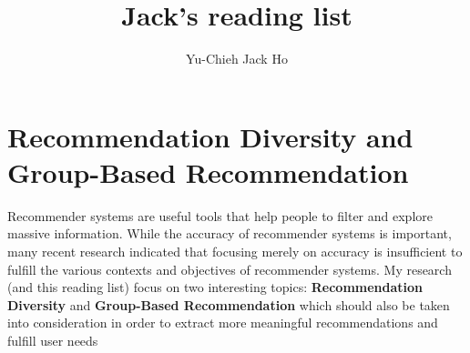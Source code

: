\documentclass[a4paper]{article}
\title{\textbf{Jack's reading list}}
\author{Yu-Chieh Jack Ho}
\begin{document}
\maketitle

\section{Recommendation Diversity and Group-Based Recommendation}
Recommender systems \cite{Resnick:CACM1997} are useful tools that help people to filter and explore massive information. While the accuracy of recommender systems is important, many recent research indicated that focusing merely on accuracy is insufficient to fulfill the various contexts and objectives of recommender systems. My research (and this reading list) focus on two interesting topics: 
\textbf{Recommendation Diversity} 
\cite{gini:JSTOR1921} 
\cite{Yin:VLDB2012}
\cite{Herlocker:SIGIR1999}
\cite{bradley:AICS2001}
\cite{Herlocker:TOIS2004}
\cite{Huang:IUI2005}
\cite{LIN:Phd2005}
\cite{Goldstein:hbr2006}
\cite{Jones:NAEC2007}
\cite{anderson:Hyperion2008}
\cite{Koren:KDD2008}
\cite{Park:RecSys2008}
\cite{Zhang:RecSys2008}
\cite{Fleder:MS2009}
\cite{Koren:Computer2009}
\cite{Zhang:RecSys2009}
\cite{Brynjolfsson:ISR2010}
\cite{Adomavicius:DiveRS2011}
\cite{Brynjolfsson:MS2011}
\cite{Shani:RSH2011}
\cite{Adomavicius:TKDE2012}
\cite{Krzywicki:IAAI2012}
\cite{Oestreicher-Singer:MISQ2012}
\cite{Pizzato:UMUAI2012}
\cite{Pu:UMUAI2012}
\cite{Rendle:tist2012}
\cite{Lacerda:WSDM2013}
\cite{Park:TKDE2013}
and \textbf{Group-Based Recommendation} 
\cite{kendall:JSTOR1938} 
\cite{Neumann:1947PUP}
\cite{arrow:JSTOR1950}
\cite{Nash:1950NAS}
\cite{kemeny:JSTOR1959}
\cite{Fudenberg:MIT1991}
\cite{Barber:ACMTrans1996}
\cite{McCarthy:CSCW1998}
\cite{Pennock:AAAI2000}
\cite{Dwork:WWW2001}
\cite{Blei:2003JMLR}
\cite{masthoff:UMUAI2004}
\cite{Hinton:JNC2006}
\cite{mccarthy:FLAIRS2006}
\cite{Yu:UMUAI2006}
\cite{Amer-Yahia:VLDB2009}
\cite{Baltrunas:RecSys2010}
\cite{Berkovsky:RecSys2010}
\cite{McNee:CHIEA2006}
\cite{Hu:CAMRa2011}
\cite{Said:CAMR2011}
\cite{DePessemier:RecSys2012}
\cite{Liu:CIKM2012}
\cite{Ye:SIGIR2012}
\cite{zhang2012groups}
\cite{Carvalho:WWW2013}
\cite{Gorla:WWW2013}
\cite{christensen:OIR2014}
\cite{Hu:AAAI2014}
\cite{quijano:Springer2014}
\cite{Yuan:KDD2014}
\cite{Freudenthaler:NIPS2011} 
which should also be taken into consideration in order to extract more meaningful recommendations and fulfill user needs


 

\end{document}
